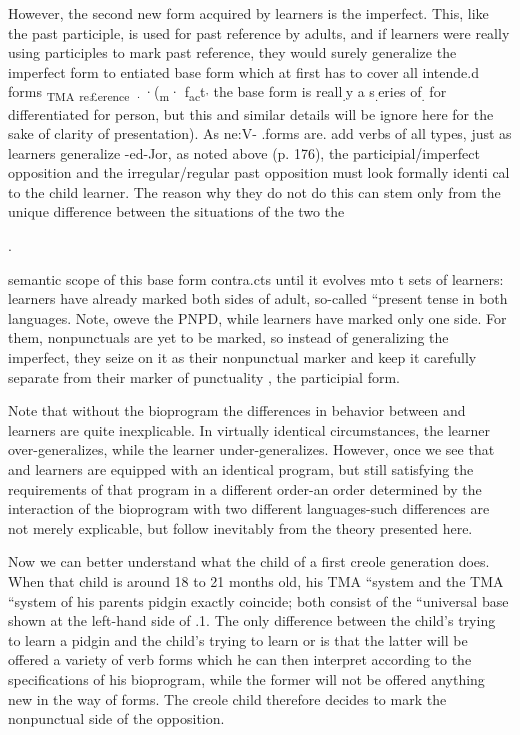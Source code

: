However, the second new form acquired by  learners
is the imperfect. This, like the past participle, is used for past reference by adults, and if  learners were really using participles to mark past reference, they would surely generalize the imperfect form to
entiated base form which at first has to cover all intende.d forms \textsubscript{TMA}\textsubscript{ }\textsubscript{r}\textsubscript{e}\textsubscript{£}\textsubscript{erence}\textsubscript{ }\textsubscript{·}·(\textsubscript{m}· f\textsubscript{a}\textsubscript{c}t\textsubscript{'}\textsubscript{ }the  base form is reall\textsubscript{.}y a s\textsubscript{.}eries of\textsubscript{.}\textsubscript{ }for differentiated for person, but this and similar details will be ignore
here for the sake of clarity of presentation). As ne:V- .forms are. add
verbs of all types, just as  learners generalize {}-ed-Jor, as noted
above (p. 176), the  participial/imperfect opposition and the
 irregular/regular past opposition must look formally identi\-
cal to the child learner. The reason why they do not do this can stem only from the unique difference between the situations of the two the

.

semantic scope of this base form contra.cts until it evolves mto t
sets of learners:  learners have already marked both sides of
adult, so-called ``present tense in both languages. Note, oweve 
the PNPD, while  learners have marked only one side. For them, nonpunctuals are yet to be marked, so instead of generalizing the imperfect, they seize on it as their nonpunctual marker and keep it carefully separate from their marker of punctuality , the participial form.

Note that without the bioprogram the differences in behavior between  and  learners are quite inexplicable. In virtually identical circumstances, the  learner over-generalizes, while the  learner under-generalizes. However, once we see that  and  learners are equipped with an identical program, but still satisfying the requirements of that program in a different order-an order determined by the interaction of the bioprogram with two different languages-such differences are not merely explicable, but follow inevitably from the theory presented here.

Now we can better understand what the child of a first creole generation does. When that child is around 18 to 21 months old, his TMA ``system and the TMA ``system of his parents pidgin exactly coincide; both consist of the ``universal base shown at the left-hand side of .1. The only difference between the child's trying to learn a pidgin and the child's trying to learn  or  is that the latter will be offered a variety of verb forms which he can then interpret according to the specifications of his bioprogram, while the former will not be offered anything new in the way of forms. The creole child therefore decides to mark the nonpunctual side of the opposition.

